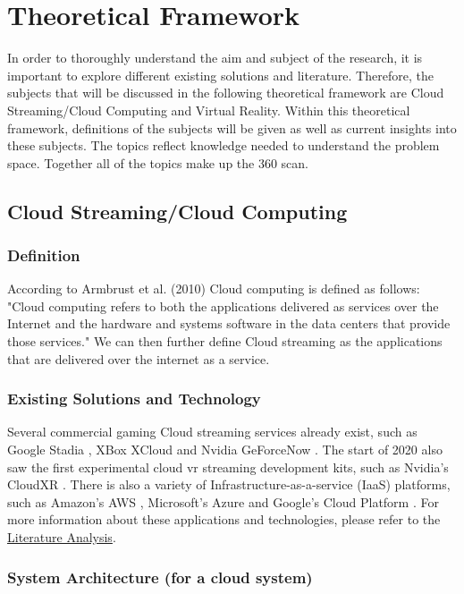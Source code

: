 \section{Theoretical Framework}

In order to thoroughly understand the aim and subject of the research, it is important to explore different existing solutions and literature. Therefore, the subjects that will be discussed in the  following theoretical framework are Cloud Streaming/Cloud Computing and Virtual Reality. Within this theoretical framework, definitions of the subjects will be given as well as current insights into these subjects. The topics reflect knowledge needed to understand the problem space. Together all of the topics make up the 360 scan.

\subsection{Cloud Streaming/Cloud Computing}

\subsubsection{Definition}
According to Armbrust et al. (2010) Cloud computing is defined as follows: 
"Cloud computing refers to both the applications delivered as services over the Internet and the hardware and systems software in the data centers that provide those services." \parencite[]{aviewoncc}
We can then further define Cloud streaming as the applications that are delivered over the internet as a service.

\subsubsection{Existing Solutions and Technology}
Several commercial gaming Cloud streaming services already exist, such as Google Stadia \parencite{stadia}, XBox XCloud \parencite{xcloud} and Nvidia GeForceNow \parencite{geforcenow}. The start of 2020 also saw the first experimental cloud \acrshort{vr} streaming development kits, such as Nvidia's CloudXR \parencite{cloudxr}. There is also a variety of Infrastructure\hyp{}as\hyp{}a\hyp{}service (IaaS) platforms, such as Amazon's AWS \parencite{aws}, Microsoft's Azure \parencite{azure} and Google's Cloud Platform \parencite{gcp}. For more information about these applications and technologies, please refer to the \hyperref[sec:lit]{Literature Analysis}.

\subsubsection{System Architecture (for a cloud system)}

